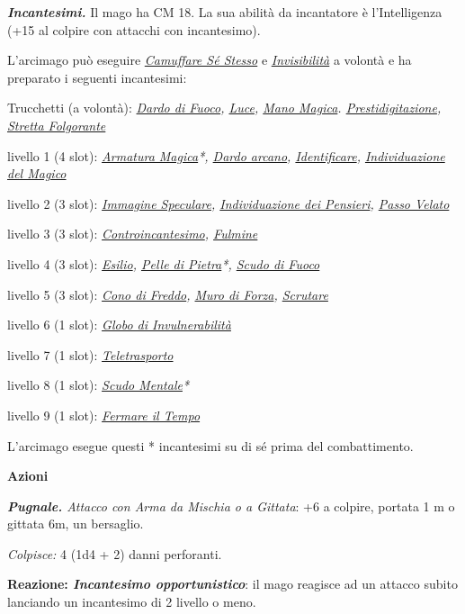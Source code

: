 \begin{multicols}{2}
{\emph{\textbf{Incantesimi.}} Il mago ha CM 18. La sua abilità da incantatore è l'Intelligenza (+15 al colpire con attacchi con incantesimo).

L'arcimago può eseguire \emph{\hyperlink{Camuffare Sé Stesso}{Camuffare Sé Stesso}} e \emph{\hyperlink{Invisibilità}{Invisibilità}} a volontà e ha preparato i seguenti incantesimi:

Trucchetti (a volontà): \emph{\hyperlink{Dardo di Fuoco}{Dardo di Fuoco}, \hyperlink{Luce}{Luce}, \hyperlink{Mano Magica}{Mano Magica}. \hyperlink{Prestidigitazione}{Prestidigitazione}, \hyperlink{Stretta Folgorante}{Stretta Folgorante}}

livello 1 (4 slot): \emph{\hyperlink{Armatura Magica}{Armatura Magica}*, \hyperlink{Dardo arcano}{Dardo arcano}, \hyperlink{Identificare}{Identificare}, \hyperlink{Individuazione del Magico}{Individuazione del Magico}}

livello 2 (3 slot): \emph{\hyperlink{Immagine Speculare}{Immagine Speculare}, \hyperlink{Individuazione dei Pensieri}{Individuazione dei Pensieri}, \hyperlink{Passo Velato}{Passo Velato}}

livello 3 (3 slot): \emph{\hyperlink{Controincantesimo}{Controincantesimo}, \hyperlink{Fulmine}{Fulmine}}

livello 4 (3 slot): \emph{\hyperlink{Esilio}{Esilio}, \hyperlink{Pelle di Pietra}{Pelle di Pietra}*, \hyperlink{Scudo di Fuoco}{Scudo di Fuoco}}

livello 5 (3 slot): \emph{\hyperlink{Cono di Freddo}{Cono di Freddo}, \hyperlink{Muro di Forza}{Muro di Forza}, \hyperlink{Scrutare}{Scrutare}}

livello 6 (1 slot): \emph{\hyperlink{Globo di Invulnerabilità}{Globo di Invulnerabilità}}

livello 7 (1 slot): \emph{\hyperlink{Teletrasporto}{Teletrasporto}}

livello 8 (1 slot): \emph{\hyperlink{Scudo Mentale}{Scudo Mentale}*}

livello 9 (1 slot): \emph{\hyperlink{Fermare il Tempo}{Fermare il Tempo}}

L'arcimago esegue questi {*} incantesimi su di sé prima del combattimento.

\textbf{Azioni}

\emph{\textbf{Pugnale.} Attacco con Arma da Mischia o a Gittata}: +6 a colpire, portata 1 m o gittata 6m, un bersaglio.

\emph{Colpisce:} 4 (1d4 + 2) danni perforanti.

\textbf{Reazione: \emph{Incantesimo opportunistico}}: il mago reagisce ad un attacco subito lanciando un incantesimo di 2 livello o meno.

}
\end{multicols}
